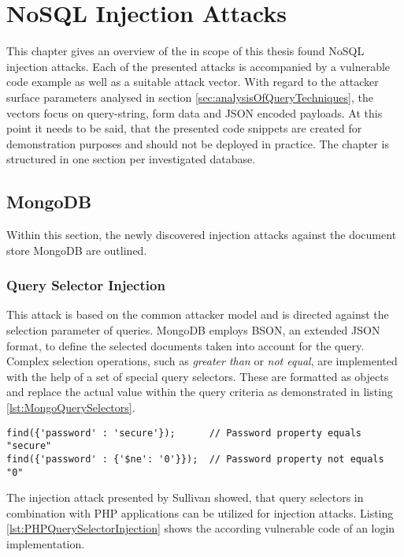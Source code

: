 \chapter{NoSQL Injection Attacks}
This chapter gives an overview of the in scope of this thesis found NoSQL injection attacks. Each of the presented attacks is accompanied by a vulnerable code example as well as a suitable attack vector. With regard to the attacker surface parameters analysed in section \ref{sec:analysisOfQueryTechniques}, the vectors focus on query-string, form data and JSON encoded payloads. At this point it needs to be said, that the presented code snippets are created for demonstration purposes and should not be deployed in practice. The chapter is structured in one section per investigated database.

\section{MongoDB}
Within this section, the newly discovered injection attacks against the document store MongoDB are outlined.

\subsection{Query Selector Injection}
This attack is based on the common attacker model and is directed against the selection parameter of queries. MongoDB employs BSON, an extended JSON format, to define the selected documents taken into account for the query. Complex selection operations, such as \emph{greater than} or \emph{not equal}, are implemented with the help of a set of special query selectors. These are formatted as objects and replace the actual value within the query criteria as demonstrated in listing \ref{lst:MongoQuerySelectors}. \\

\begin{lstlisting}[caption={Example for MongoDB's query selectors}, label={lst:MongoQuerySelectors}]
find({'password' : 'secure'});      // Password property equals "secure"
find({'password' : {'$ne': '0'}});  // Password property not equals "0"
\end{lstlisting}

The injection attack presented by Sullivan \cite{Sullivan:2011} showed, that query selectors in combination with PHP applications can be utilized for injection attacks. Listing \ref{lst:PHPQuerySelectorInjection} shows the according vulnerable code of an login implementation. \\

